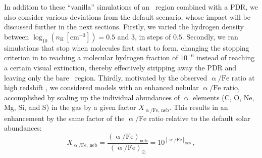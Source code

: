 In addition to these ``vanilla'' simulations of an \HII\ region combined with a PDR, we also consider various deviations from the default scenario, whose impact will be discussed further in the next sections. Firstly, we varied the hydrogen density between $\log_{10} ( n_\text{H} \, [\mathrm{cm^{-3}}] ) = 0.5$ and $3$, in steps of $0.5$. Secondly, we ran simulations that stop when molecules first start to form, changing the stopping criterion in  to reaching a molecular hydrogen fraction of $10^{-6}$ instead of reaching a certain visual extinction, thereby effectively stripping away the PDR and leaving only the bare \HII\ region. Thirdly, motivated by the observed $\mathrm{\upalpha/Fe}$ ratio at high redshift \citep[e.g.][]{2016ApJ...826..159S}, we considered models with an enhanced nebular $\mathrm{\upalpha/Fe}$ ratio, accomplished by scaling up the individual abundances of $\upalpha$ elements (C, O, Ne, Mg, Si, and S) in the gas by a given factor $X_\mathrm{\upalpha/Fe, \, neb}$. This results in an enhancement by the same factor of the $\mathrm{\upalpha/Fe}$ ratio relative to the default solar abundances:
\begin{equation*}
    X_\mathrm{\upalpha/Fe, \, neb} = \frac{\mathrm{\left( \upalpha/Fe \right)_{neb}}}{\mathrm{\left( \upalpha/Fe \right)}_\odot} = 10^{\left[ \mathrm{\upalpha/Fe} \right]_\text{neb}} \, ,
\end{equation*}

